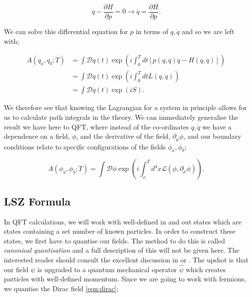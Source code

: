 \begin{equation}
\dot{q} - \frac{\partial H}{\partial p} = 0 \to \dot{q} = \frac{\partial H}{\partial p}.
\end{equation}

We can solve this differential equation for $p$ in terms of $q, \dot{q}$ and so we are left with;

\begin{equation}
\begin{split}
A(q_a, q_b;T) &=  \int \mathcal{D}q(t) \exp \left(i \int_0^T dt [p(q,\dot{q}) \dot{q} - H(q,\dot{q})] \right) \\
&= \int \mathcal{D}q(t) \exp \left(i \int_0^T dt L(q,\dot{q}) \right) \\
&= \int \mathcal{D}q(t) \exp \left(i S \right).
\end{split}
\end{equation}

We therefore see that knowing the Lagrangian for a system in principle allows for us to calculate path integrals in the theory. We can immediately generalise the result we have here to QFT, where instead of the co-ordinates $q, \dot{q}$ we have a dependence on a field, $\phi$, and the derivative of the field, $\partial_\mu \phi$, and our boundary conditions relate to specific configurations of the fields $\phi_a, \phi_b$;

\begin{equation}
A(\phi_a, \phi_b;T) = \int \mathcal{D}\phi \exp \left(i \int_o^T d^4 x \mathscr{L}(\phi, \partial_\mu \phi) \right).
\end{equation}

\subsection{LSZ Formula}

In QFT calculations, we will work with well-defined in and out states which are states containing a set number of known particles. In order to construct these states, we first have to quantise our fields. The method to do this is called \emph{canonical quantisation} and a full description of this will not be given here. The interested reader should consult the excellent discussion in \cite{Peskin1995} or \cite{Srednicki2007}. The upshot is that our field $\psi$ is upgraded to a quantum mechanical operator $\hat{\psi}$ which creates particles with well-defined momentum. Since we are going to work with fermions, we quantise the Dirac field \ref{eqn:dirac};

